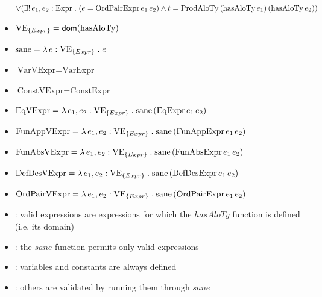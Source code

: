 \documentclass[xcolor={dvipsnames}]{beamer}
\begin{document}
\begin{frame}
\begin{thyext}[Expressions]
\begin{itemize}
{        $\lor (\exists!\, e_1,e_2 : \text{Expr} \mathrel{.} (e = \text{OrdPairExpr}\,e_1\,e_2) \land t = \text{ProdAloTy}\,(\text{hasAloTy}\,e_1)\,{(\text{hasAloTy}\,e_2)})$}
\item<only@2,6> \scriptsize$\text{VE}_{\{ Expr \}} = {\sf dom}(\text{hasAloTy})$
\item<only@3,6> \scriptsize$\text{sane} = \lambda\, e : \text{VE}_{\{ Expr \}} \mathrel{.} e$
\item<only@4,6> \scriptsize$\text{VarVExpr} = \text{VarExpr}$
\item<only@4,6> \scriptsize$\text{ConstVExpr} = \text{ConstExpr}$
\item<only@5,6> \scriptsize$\text{EqVExpr} = \lambda\, e_1, e_2 : \text{VE}_{\{ Expr \}} \mathrel{.} \text{sane}\,(\text{EqExpr}\,e_1\,e_2)$
\item<only@5,6> \scriptsize$\text{FunAppVExpr} = \lambda\, e_1, e_2 : \text{VE}_{\{ Expr \}} \mathrel{.} \text{sane}\,(\text{FunAppExpr}\,e_1\,e_2)$
\item<only@5,6> \scriptsize$\text{FunAbsVExpr} = \lambda\, e_1, e_2 : \text{VE}_{\{ Expr \}} \mathrel{.} \text{sane}\,(\text{FunAbsExpr}\,e_1\,e_2)$
\item<only@5,6> \scriptsize$\text{DefDesVExpr} = \lambda\, e_1, e_2 : \text{VE}_{\{ Expr \}} \mathrel{.} \text{sane}\,(\text{DefDesExpr}\,e_1\,e_2)$
\item<only@5,6> \scriptsize$\text{OrdPairVExpr} = \lambda\, e_1, e_2 : \text{VE}_{\{ Expr \}} \mathrel{.} \text{sane}\,(\text{OrdPairExpr}\,e_1\,e_2)$
\ee
\end{itemize}
\end{thyext}
\vspace{-3mm}
\begin{itemize}
    \item<only@2,6>[\boxednumber{2}]: valid expressions are expressions for which the $hasAloTy$ function is defined (i.e. its domain)
    \item<only@3,6>[\boxednumber{3}]: the $sane$ function permits only valid expressions
    \item<only@4,6>[\boxednumber{4}\&\boxednumber{5}]: variables and constants are always defined
    \item<only@5,6>[\boxednumber{6}-\boxednumber{10}]: others are validated by running them through $sane$
\end{itemize}
\end{frame}
\end{document}
